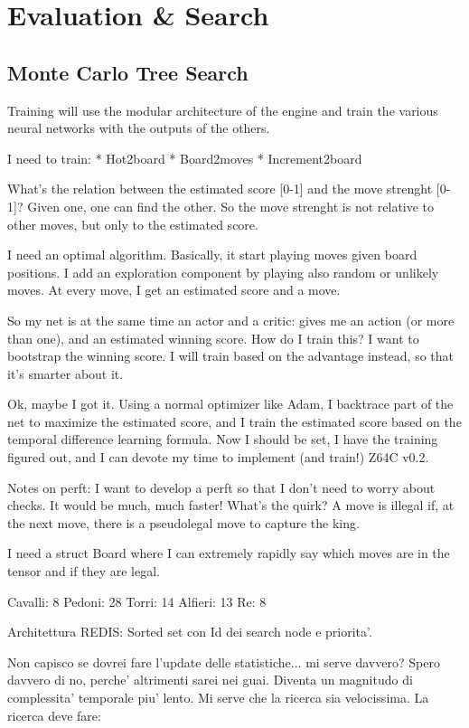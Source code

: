 \chapter{Evaluation \& Search}

\section{Monte Carlo Tree Search}
Training will use the modular architecture of the engine and train the various
neural networks with the outputs of the others.

I need to train:
* Hot2board
* Board2moves
* Increment2board

What's the relation between the estimated score [0-1] and the move strenght
[0-1]? Given one, one can find the other. So the move strenght is not relative
to other moves, but only to the estimated score.

I need an optimal algorithm.
Basically, it start playing moves given board positions. I add an exploration
component by playing also random or unlikely moves. At every move, I get an
estimated score and a move.

So my net is at the same time an actor and a critic: gives me an action (or more
than one), and an estimated winning score. How do I train this? I want to
bootstrap the winning score. I will train based on the advantage instead, so
that it's smarter about it.

Ok, maybe I got it. Using a normal optimizer like Adam, I backtrace part of the
net to maximize the estimated score, and I train the estimated score based on
the temporal difference learning formula. Now I should be set, I have the
training figured out, and I can devote my time to implement (and train!) Z64C
v0.2.

Notes on perft:
I want to develop a perft so that I don't need to worry about checks. It would
be much, much faster! What's the quirk?
A move is illegal if, at the next move, there is a pseudolegal move to capture the
king.

I need a struct Board where I can extremely rapidly say which moves are in the
tensor and if they are legal.

Cavalli: 8
Pedoni: 28
Torri: 14
Alfieri: 13
Re: 8

Architettura REDIS:
Sorted set con Id dei search node e priorita'.

Non capisco se dovrei fare l'update delle statistiche... mi serve davvero?
Spero davvero di no, perche' altrimenti sarei nei guai. Diventa un magnitudo di
complessita' temporale piu' lento. Mi serve che la ricerca sia velocissima. La
ricerca deve fare:

